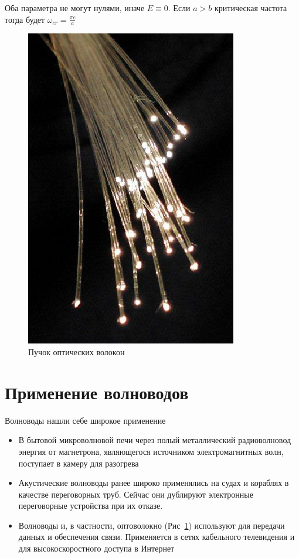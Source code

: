 \documentclass[a4paper, 14pt]{article}
\begin{document}
    Оба параметра не могут нулями, иначе $E \equiv 0$.
    Если $a > b$ критическая частота тогда будет $\omega_{cr} = \frac{\pi c}{a}$
    
    \begin{figure}[h]
        \begin{center}
            \begin{minipage}[h]{0.74\linewidth}
                \centering
                \includegraphics[width = 0.5 \textwidth]{fibreoptic}
                \caption{Пучок оптических волокон}
                \label{fig:fibreoptic}
            \end{minipage}
        \end{center}
    \end{figure}
    
    \section*{Применение волноводов} 
    
    Волноводы нашли себе широкое применение
    
    \begin{itemize}
        \item В бытовой микроволновой печи через полый металлический радиоволновод энергия от магнетрона, являющегося
        источником электромагнитных волн, поступает в камеру для разогрева
        \item Акустические волноводы ранее широко применялись на судах и кораблях в качестве переговорных труб.
        Сейчас они дублируют электронные переговорные устройства при их отказе.
        \item Волноводы и, в частности, оптоволокно (Рис~\ref{fig:fibreoptic}) используют для передачи данных и
        обеспечения связи.
        Применяется в сетях кабельного телевидения и для высокоскоростного доступа в Интернет
    \end{itemize}
    
\end{document}
